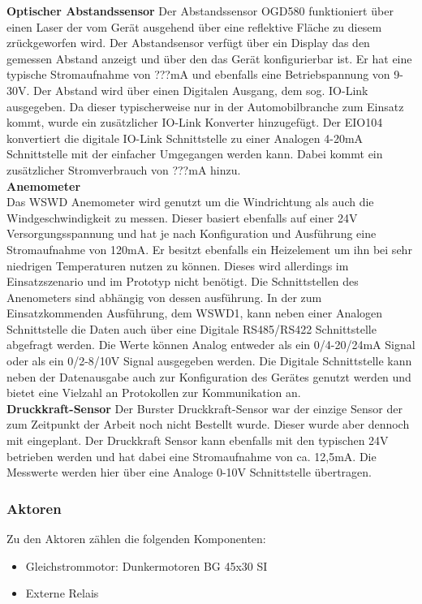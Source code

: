 \noindent\textbf{Optischer Abstandssensor}\newline
Der Abstandssensor OGD580 funktioniert über einen Laser der vom Gerät ausgehend über eine reflektive Fläche zu diesem zrückgeworfen wird. Der Abstandsensor verfügt über ein Display das den gemessen Abstand anzeigt und über den das Gerät konfigurierbar ist. Er hat eine typische Stromaufnahme von ???mA und ebenfalls eine Betriebspannung von 9-30V. Der Abstand wird über einen Digitalen Ausgang, dem sog. IO-Link ausgegeben. Da dieser typischerweise nur in der Automobilbranche zum Einsatz kommt, wurde ein zusätzlicher IO-Link Konverter hinzugefügt. Der EIO104 konvertiert die digitale IO-Link Schnittstelle zu einer Analogen 4-20mA Schnittstelle mit der einfacher Umgegangen werden kann. Dabei kommt ein zusätzlicher Stromverbrauch von ???mA hinzu.\\

\noindent\textbf{Anemometer}\\
Das WSWD Anemometer wird genutzt um die Windrichtung als auch die Windgeschwindigkeit zu messen. Dieser basiert ebenfalls auf einer 24V Versorgungsspannung und hat je nach Konfiguration und Ausführung eine Stromaufnahme von 120mA. Er besitzt ebenfalls ein Heizelement um ihn bei sehr niedrigen Temperaturen nutzen zu können. Dieses wird allerdings im Einsatzszenario und im Prototyp nicht benötigt. Die Schnittstellen des Anenometers sind abhängig von dessen ausführung. In der zum Einsatzkommenden Ausführung, dem WSWD1, kann neben einer Analogen Schnittstelle die Daten auch über eine Digitale RS485/RS422 Schnittstelle abgefragt werden. Die Werte können Analog entweder als ein 0/4-20/24mA Signal oder als ein 0/2-8/10V Signal ausgegeben werden. Die Digitale Schnittstelle kann neben der Datenausgabe auch zur Konfiguration des Gerätes genutzt werden und bietet eine Vielzahl an Protokollen zur Kommunikation an.\\

\noindent\textbf{Druckkraft-Sensor}\newline
Der Burster Druckkraft-Sensor war der einzige Sensor der zum Zeitpunkt der Arbeit noch nicht Bestellt wurde. Dieser wurde aber dennoch mit eingeplant. Der Druckkraft Sensor kann ebenfalls mit den typischen 24V betrieben werden und hat dabei eine Stromaufnahme von ca. 12,5mA. Die Messwerte werden hier über eine Analoge 0-10V Schnittstelle übertragen.\\
\subsubsection{Aktoren}
Zu den Aktoren zählen die folgenden Komponenten:
\begin{itemize}
	\item Gleichstrommotor: Dunkermotoren BG 45x30 SI
	\item Externe Relais
\end{itemize}

